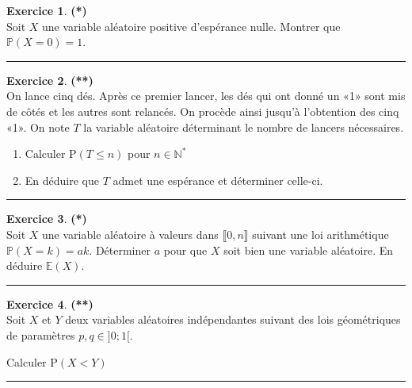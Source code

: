 \documentclass[a4paper,11pt]{article}
\theoremstyle{definition}
\newtheorem{exo}{Exercice} %
\begin{document}
\begin{exo}\textbf{(*)}\quad\\[0.15cm]%

	Soit $X$ une variable aléatoire positive d'espérance nulle. Montrer que $\mathbb P(X = 0) = 1$.
	
	\centering
	\rule{1\linewidth}{0.6pt}
\end{exo}
	
\begin{exo}\textbf{(**)}\quad\\[0.15cm]%
	On lance cinq dés. Après ce premier lancer, les dés qui ont donné un «1» sont mis de côtés et les autres sont relancés. On procède ainsi jusqu'à l'obtention des cinq «1». On note $T$ la variable aléatoire déterminant le nombre de lancers nécessaires.
	
	\begin{enumerate}
		\item Calculer $\mathrm{P}(T \leq n)$ pour $n \in \mathbb{N}^{*}$
		\item En déduire que $T$ admet une espérance et déterminer celle-ci.
	\end{enumerate}
 
	\centering
	\rule{1\linewidth}{0.6pt}
\end{exo}

	

\begin{exo}\textbf{(*)}\quad\\[0.15cm]%
	Soit $X$ une variable aléatoire à valeurs dans $\llbracket0, n \rrbracket$ suivant une loi arithmétique $ \mathbb P(X = k ) = a k $. Déterminer $a$ pour que $X$ soit bien une variable aléatoire. En déduire $\mathbb E(X )$.
	
	\centering
	\rule{1\linewidth}{0.6pt}
\end{exo}

\begin{exo}\textbf{(**)}\quad\\[0.15cm]%
	Soit $X$ et $Y$ deux variables aléatoires indépendantes suivant des lois géométriques de paramètres $p, q \in] 0 ; 1[$.
	
	Calculer $\mathrm{P}(X<Y)$
	
	\centering
\rule{1\linewidth}{0.6pt}
\end{exo}
\end{document}

